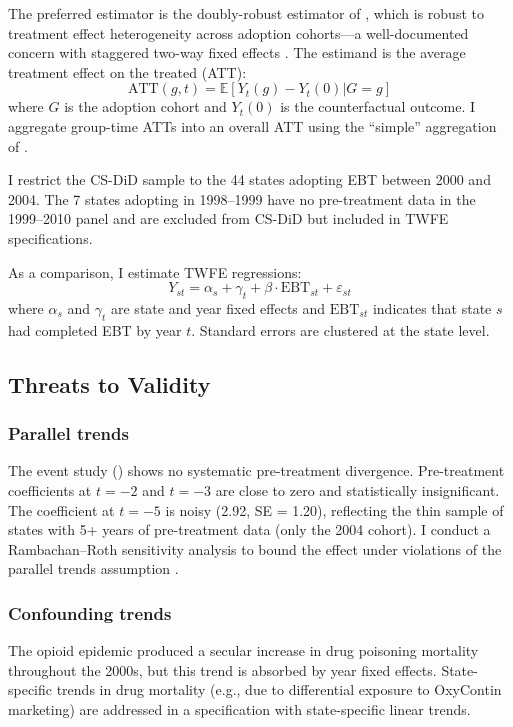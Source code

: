 \documentclass[12pt]{article}
\newcommand{\E}{\mathbb{E}}
\begin{document}
The preferred estimator is the doubly-robust estimator of \citet{callaway2021difference}, which is robust to treatment effect heterogeneity across adoption cohorts---a well-documented concern with staggered two-way fixed effects \citep{goodman2021difference, sun2021estimating, dechaisemartin2020two}. The estimand is the average treatment effect on the treated (ATT):
\begin{equation}
\text{ATT}(g,t) = \E[Y_t(g) - Y_t(0) | G = g]
\end{equation}
where $G$ is the adoption cohort and $Y_t(0)$ is the counterfactual outcome. I aggregate group-time ATTs into an overall ATT using the ``simple'' aggregation of \citet{callaway2021difference}.

I restrict the CS-DiD sample to the 44 states adopting EBT between 2000 and 2004. The 7 states adopting in 1998--1999 have no pre-treatment data in the 1999--2010 panel and are excluded from CS-DiD but included in TWFE specifications.

As a comparison, I estimate TWFE regressions:
\begin{equation}
Y_{st} = \alpha_s + \gamma_t + \beta \cdot \text{EBT}_{st} + \varepsilon_{st}
\end{equation}
where $\alpha_s$ and $\gamma_t$ are state and year fixed effects and $\text{EBT}_{st}$ indicates that state $s$ had completed EBT by year $t$. Standard errors are clustered at the state level.

\subsection{Threats to Validity}

\subsubsection*{Parallel trends} The event study () shows no systematic pre-treatment divergence. Pre-treatment coefficients at $t=-2$ and $t=-3$ are close to zero and statistically insignificant. The coefficient at $t=-5$ is noisy (2.92, SE = 1.20), reflecting the thin sample of states with 5+ years of pre-treatment data (only the 2004 cohort). I conduct a Rambachan--Roth sensitivity analysis to bound the effect under violations of the parallel trends assumption \citep{rambachan2023more}.

\subsubsection*{Confounding trends} The opioid epidemic produced a secular increase in drug poisoning mortality throughout the 2000s, but this trend is absorbed by year fixed effects. State-specific trends in drug mortality (e.g., due to differential exposure to OxyContin marketing) are addressed in a specification with state-specific linear trends.
\end{document}
